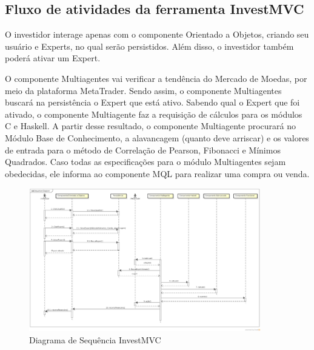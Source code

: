 \subsection{Fluxo de atividades  da ferramenta InvestMVC}

O investidor interage apenas com o componente Orientado a Objetos, criando seu usuário e Experts, no qual serão persistidos. Além disso, o investidor também poderá ativar um Expert.

O componente Multiagentes vai verificar a tendência do Mercado de Moedas, por meio da plataforma MetaTrader. Sendo assim, o componente Multiagentes buscará na persistência o Expert que está ativo. Sabendo qual o Expert que foi ativado, o componente Multiagente faz a requisição de cálculos para os módulos C e Haskell. A partir desse resultado, o componente Multiagente procurará no Módulo Base de Conhecimento, a alavancagem (quanto deve arriscar) e os valores de entrada para o método de Correlação de Pearson, Fibonacci e Mínimos Quadrados. Caso todas as especificações para o módulo Multiagentes sejam obedecidas, ele informa ao componente MQL para realizar uma compra ou venda.

\begin{figure}[H]
\centering
\includegraphics[width=0.9\textwidth]{figuras/sequencia}
\caption{Diagrama de Sequência InvestMVC} 
\label{sequencia}
\end{figure}
